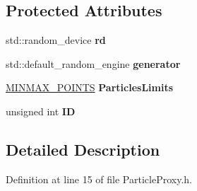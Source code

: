 \subsection*{Protected Attributes}
\begin{DoxyCompactItemize}
\item 
std\+::random\+\_\+device {\bfseries rd}\hypertarget{class_particle_proxy_aef862b0dbc62c558e9deeae5e1ce89dd}{}\label{class_particle_proxy_aef862b0dbc62c558e9deeae5e1ce89dd}

\item 
std\+::default\+\_\+random\+\_\+engine {\bfseries generator}\hypertarget{class_particle_proxy_a80e20d33bffbd36eadec1dbc04dab051}{}\label{class_particle_proxy_a80e20d33bffbd36eadec1dbc04dab051}

\item 
\hyperlink{struct_m_i_n_m_a_x___p_o_i_n_t_s}{M\+I\+N\+M\+A\+X\+\_\+\+P\+O\+I\+N\+TS} {\bfseries Particles\+Limits}\hypertarget{class_particle_proxy_ab3b40fd972f605120cdb07ebe7400fa7}{}\label{class_particle_proxy_ab3b40fd972f605120cdb07ebe7400fa7}

\item 
unsigned int {\bfseries ID}\hypertarget{class_particle_proxy_a17b2cd405a9fc2ad5ac05ecd9420692e}{}\label{class_particle_proxy_a17b2cd405a9fc2ad5ac05ecd9420692e}

\end{DoxyCompactItemize}


\subsection{Detailed Description}


Definition at line 15 of file Particle\+Proxy.\+h.

